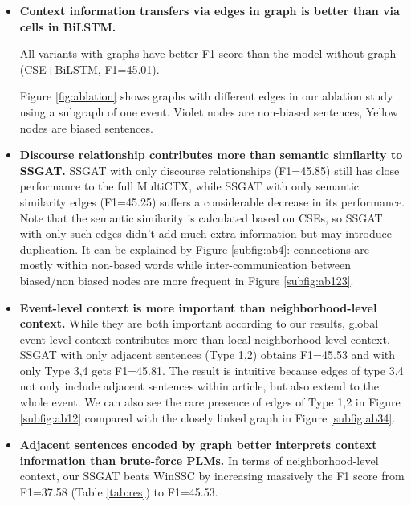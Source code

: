 \documentclass[letterpaper]{article} %
\begin{document}
\begin{itemize}
    \item \textbf{Context information transfers via edges in graph is better than via cells in BiLSTM. }
    
    All variants with graphs have better F1 score than the model without graph (CSE+BiLSTM, F1=45.01). 
    
    Figure \ref{fig:ablation} shows graphs with different edges in our ablation study using a subgraph of one event. {Violet nodes} are non-biased sentences, {Yellow nodes} are biased sentences.
    
    \item \textbf{Discourse relationship contributes more than semantic similarity to SSGAT.} SSGAT with only discourse relationships (F1=45.85) still has close performance to the full MultiCTX, while SSGAT with only semantic similarity edges (F1=45.25) suffers a considerable decrease in its performance. Note that the semantic similarity is calculated based on CSEs, so SSGAT with only such edges didn't add much extra information but may introduce duplication. It can be explained by Figure \ref{subfig:ab4}: connections are mostly within non-based words while inter-communication between biased/non biased nodes are more frequent in Figure \ref{subfig:ab123}.
    
    

    \item \textbf{Event-level context is more important than neighborhood-level context.} While they are both important according to our results, global event-level context contributes more than local neighborhood-level context. SSGAT with only adjacent sentences (Type 1,2) obtains F1=45.53 and with only Type 3,4 gets F1=45.81. The result is intuitive because edges of type 3,4 not only include adjacent sentences within article, but also extend to the whole event. We can also see the rare presence of edges of Type 1,2 in Figure \ref{subfig:ab12} compared with the closely linked graph in Figure  \ref{subfig:ab34}.

    \item \textbf{Adjacent sentences encoded by graph better interprets context information than brute-force PLMs.} In terms of neighborhood-level context, our SSGAT beats WinSSC by increasing massively the F1 score from F1=37.58 (Table \ref{tab:res}) to F1=45.53. 
    

\end{itemize}
\end{document}

